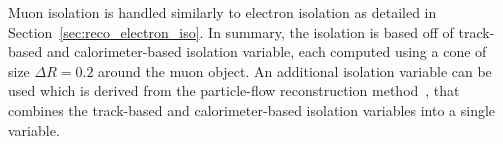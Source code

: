 Muon isolation is handled similarly to electron isolation as detailed in Section~\ref{sec:reco_electron_iso}. In summary, the isolation is based off of track-based and calorimeter-based isolation variable, each computed using a cone of size $\Delta R = 0.2$ around the muon object. An additional isolation variable can be used which is derived from the particle-flow reconstruction method~\cite{ATLAS:2017ghe}, that combines the track-based and calorimeter-based isolation variables into a single variable.
